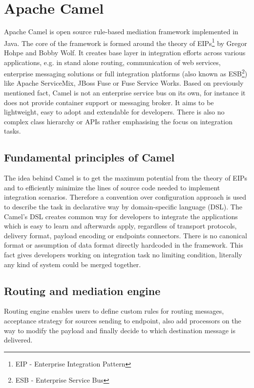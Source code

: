 \documentclass[12pt,final,oneside]{fithesis2}
\begin{document}
\section{Apache Camel}
Apache Camel is open source rule-based mediation framework implemented in Java. The core of the framework is formed around the theory of EIPs\footnote{EIP - Enterprise Integration Pattern} by Gregor Hohpe and Bobby Wolf. It creates base layer in integration efforts across various applications, e.g. in stand alone routing, communication of web services, enterprise messaging solutions or full integration platforms (also known as ESB\footnote{ESB - Enterprise Service Bus}) like Apache ServiceMix, JBoss Fuse or Fuse Service Works. Based on previously mentioned fact, Camel is not an enterprise service bus on its own, for instance it does not provide container support or messaging broker. It aims to be lightweight, easy to adopt and extendable for developers. There is also no complex class hierarchy or APIs rather emphasising the focus on integration tasks.

\subsection{Fundamental principles of Camel}

The idea behind Camel is to get the maximum potential from the theory of EIPs and to efficiently minimize the lines of source code needed to implement integration scenarios. Therefore a convention over configuration approach is used to describe the task in declarative way by domain-specific language (DSL).  The Camel's DSL creates common way for developers to integrate the applications which is easy to learn and afterwards apply, regardless of transport protocols, delivery format, payload encoding or endpoints connectors. There is no canonical format or assumption of data format directly hardcoded in the framework. This fact gives developers working on integration task no limiting condition, literally any kind of system could be merged together.

\subsection*{Routing and mediation engine}
Routing engine enables users to define custom rules for routing messages, acceptance strategy for sources sending to endpoint, also add processors on the way to modify the payload and finally decide to which destination message is delivered.
\end{document}
